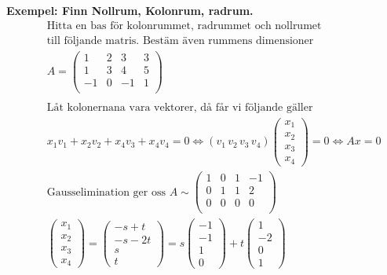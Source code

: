 \textbf{Exempel: Finn Nollrum, Kolonrum, radrum.} 
\begin{align*}
  &\quad  \text{Hitta en bas för kolonrummet, radrummet och nollrumet} \\
  &\quad  \text{till följande matris. Bestäm även rummens dimensioner} \\
  &\quad  A = 
  \left(\begin{array}{cccc}
    1 & 2 &  3 & 3  \\
    1 & 3 &  4 & 5  \\
   -1 & 0 & -1 & 1  \\
  \end{array}\right)  \\
  &\quad  \\
  &\quad  \text{Låt kolonernana vara vektorer, då får vi följande gäller }  \\
  &\quad  x_1v_1 + x_2v_2 + x_4v_3 + x_4v_4 = 0 \Leftrightarrow{} (v_1 \, v_2 \, v_3 \, v_4)
  \begin{pmatrix} x_1 \\ x_2 \\ x_3 \\ x_4 \end{pmatrix} = 0 \Leftrightarrow{} Ax=0 \\
  &\quad  \text{Gausselimination ger oss } A \sim{}
  \left(\begin{array}{cccc}
    1 & 0 & 1 & -1  \\
    0 & 1 & 1 &  2  \\
    0 & 0 & 0 &  0  \\
  \end{array}\right)  \\
  &\quad
  \begin{pmatrix} x_1 \\ x_2 \\ x_3 \\ x_4 \end{pmatrix} =
  \begin{pmatrix} -s+t \\ -s-2t \\ s \\ t \end{pmatrix} =
  s\begin{pmatrix} -1 \\ -1 \\ 1 \\ 0 \end{pmatrix} +
  t\begin{pmatrix} 1 \\ -2 \\ 0 \\ 1 \end{pmatrix} \\

\end{align*}
